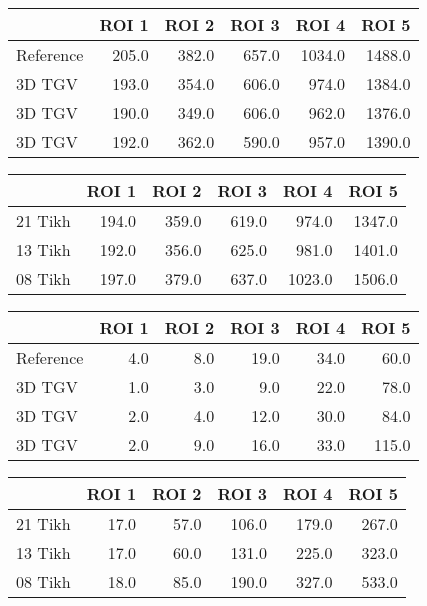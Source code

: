 \begin{tabular}{lrrrrr}
\toprule
{} &  ROI 1 &  ROI 2 &  ROI 3 &   ROI 4 &   ROI 5 \\
\midrule
Reference &  205.0 &  382.0 &  657.0 &  1034.0 &  1488.0 \\
3D TGV    &  193.0 &  354.0 &  606.0 &   974.0 &  1384.0 \\
3D TGV    &  190.0 &  349.0 &  606.0 &   962.0 &  1376.0 \\
3D TGV    &  192.0 &  362.0 &  590.0 &   957.0 &  1390.0 \\
\bottomrule
\end{tabular}
\begin{tabular}{lrrrrr}
\toprule
{} &  ROI 1 &  ROI 2 &  ROI 3 &   ROI 4 &   ROI 5 \\
\midrule
21 Tikh &  194.0 &  359.0 &  619.0 &   974.0 &  1347.0 \\
13 Tikh &  192.0 &  356.0 &  625.0 &   981.0 &  1401.0 \\
08 Tikh &  197.0 &  379.0 &  637.0 &  1023.0 &  1506.0 \\
\bottomrule
\end{tabular}
\begin{tabular}{lrrrrr}
\toprule
{} &  ROI 1 &  ROI 2 &  ROI 3 &  ROI 4 &  ROI 5 \\
\midrule
Reference &    4.0 &    8.0 &   19.0 &   34.0 &   60.0 \\
3D TGV    &    1.0 &    3.0 &    9.0 &   22.0 &   78.0 \\
3D TGV    &    2.0 &    4.0 &   12.0 &   30.0 &   84.0 \\
3D TGV    &    2.0 &    9.0 &   16.0 &   33.0 &  115.0 \\
\bottomrule
\end{tabular}
\begin{tabular}{lrrrrr}
\toprule
{} &  ROI 1 &  ROI 2 &  ROI 3 &  ROI 4 &  ROI 5 \\
\midrule
21 Tikh &   17.0 &   57.0 &  106.0 &  179.0 &  267.0 \\
13 Tikh &   17.0 &   60.0 &  131.0 &  225.0 &  323.0 \\
08 Tikh &   18.0 &   85.0 &  190.0 &  327.0 &  533.0 \\
\bottomrule
\end{tabular}
